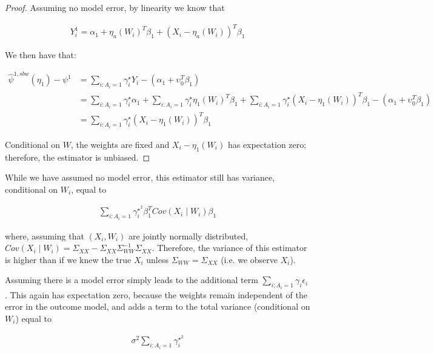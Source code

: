 \begin{proof}

Assuming no model error, by linearity we know that

\begin{align*}
Y_i^1 = \alpha_1 + \eta_a(W_i)^T\beta_1 + (X_i - \eta_a(W_i))^T\beta_1
\end{align*}

We then have that:

\begin{align*}
    \hat{\psi}^{1, sbw}(\eta_1) - \psi^1 &= \sum_{i: A_i = 1}\gamma_i^\star Y_i - (\alpha_1 + \upsilon_0^T\beta_1) \\
    &= \sum_{i: A_i = 1}\gamma_i^\star\alpha_1 + \sum_{i: A_i = 1}\gamma_i^\star\eta_1(W_i)^T\beta_1 + \sum_{i: A_i = 1}\gamma_i^\star(X_i - \eta_1(W_i))^T\beta_1 - (\alpha_1 + \upsilon_0^T\beta_1) \\
    &= \sum_{i: A_i = 1}\gamma_i^\star(X_i - \eta_1(W_i))^T\beta_1
\end{align*}

Conditional on $W$, the weights are fixed and $X_i - \eta_1(W_i)$ has expectation zero; therefore, the estimator is unbiased.
\end{proof}
\begin{remark}

While we have assumed no model error, this estimator still has variance, conditional on $W_i$, equal to

\begin{align*}
\sum_{i: A_i = 1} \gamma_i^{\star^2}\beta_1^T Cov(X_i \mid W_i)\beta_1
\end{align*}

where, assuming that $(X_i, W_i)$ are jointly normally distributed, $Cov(X_i \mid W_i) = \Sigma_{XX} - \Sigma_{XX}\Sigma_{WW}^{-1}\Sigma_{XX}$. Therefore, the variance of this estimator is higher than if we knew the true $X_i$ unless $\Sigma_{WW} = \Sigma_{XX}$ (i.e. we observe $X_i$). 
\end{remark}

\begin{remark}
Assuming there is a model error simply leads to the additional term $\sum_{i: A_i = 1}\gamma_i\epsilon_i$. This again has expectation zero, because the weights remain independent of the error in the outcome model, and adds a term to the total variance (conditional on $W_i$) equal to

\begin{align*}
\sigma^2\sum_{i: A_i = 1}\gamma_i^{\star^2}
\end{align*}
\end{remark}

